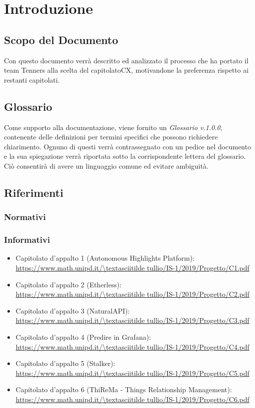 \section{Introduzione}

\subsection{Scopo del Documento}
Con questo documento verrà descritto ed analizzato il processo che ha portato il team Tenners alla scelta del capitolato\glo CX, motivandone la preferenza rispetto ai restanti capitolati.
	
\subsection{Glossario}
Come supporto alla documentazione, viene fornito un \textit{Glossario v.1.0.0}, contenente delle definizioni per termini specifici che possono richiedere chiarimento. Ognuno di questi verrà contrassegnato con un pedice \glo nel documento e la sua spiegazione verrà riportata sotto la corrispondente lettera del glossario. Ciò consentirà di avere un linguaggio comune ed evitare ambiguità. 
	
\subsection{Riferimenti}
\subsubsection{Normativi}
\subsubsection{Informativi}
\begin{itemize}
    \item Capitolato d'appalto 1 (Autonomous Highlights Platform):\\ 
    \url{https://www.math.unipd.it/\textasciitilde tullio/IS-1/2019/Progetto/C1.pdf}
    \item Capitolato d'appalto 2 (Etherless):\\ 
	\url{https://www.math.unipd.it/\textasciitilde tullio/IS-1/2019/Progetto/C2.pdf}
    \item Capitolato d'appalto 3 (NaturalAPI):\\ 
    \url{https://www.math.unipd.it/\textasciitilde tullio/IS-1/2019/Progetto/C3.pdf}
    \item Capitolato d'appalto 4 (Predire in Grafana):\\ 
    \url{https://www.math.unipd.it/\textasciitilde tullio/IS-1/2019/Progetto/C4.pdf}
    \item Capitolato d'appalto 5 (Stalker):\\ 
    \url{https://www.math.unipd.it/\textasciitilde tullio/IS-1/2019/Progetto/C5.pdf}
    \item Capitolato d'appalto 6 (ThiReMa - Things Relationship Management):\\ 
    \url{https://www.math.unipd.it/\textasciitilde tullio/IS-1/2019/Progetto/C6.pdf}
\end{itemize}

	
	

